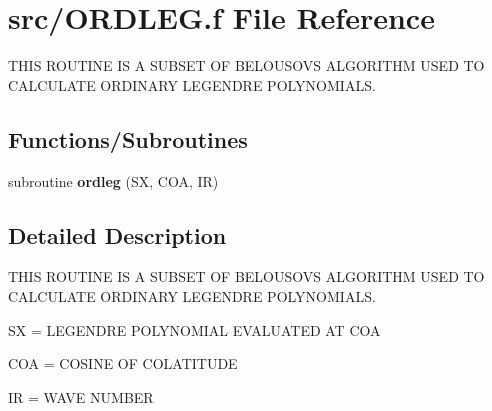 \hypertarget{ORDLEG_8f}{}\section{src/\+O\+R\+D\+L\+E\+G.f File Reference}
\label{ORDLEG_8f}


T\+H\+I\+S R\+O\+U\+T\+I\+N\+E I\+S A S\+U\+B\+S\+E\+T O\+F B\+E\+L\+O\+U\+S\+O\+V\+S A\+L\+G\+O\+R\+I\+T\+H\+M U\+S\+E\+D T\+O C\+A\+L\+C\+U\+L\+A\+T\+E O\+R\+D\+I\+N\+A\+R\+Y L\+E\+G\+E\+N\+D\+R\+E P\+O\+L\+Y\+N\+O\+M\+I\+A\+L\+S.  


\subsection*{Functions/\+Subroutines}
\begin{DoxyCompactItemize}
\item 
\hypertarget{ORDLEG_8f_a4735fe09c0b6b2fb4f5823040a0c077b}{}subroutine {\bfseries ordleg} (S\+X, C\+O\+A, I\+R)\label{ORDLEG_8f_a4735fe09c0b6b2fb4f5823040a0c077b}

\end{DoxyCompactItemize}


\subsection{Detailed Description}
T\+H\+I\+S R\+O\+U\+T\+I\+N\+E I\+S A S\+U\+B\+S\+E\+T O\+F B\+E\+L\+O\+U\+S\+O\+V\+S A\+L\+G\+O\+R\+I\+T\+H\+M U\+S\+E\+D T\+O C\+A\+L\+C\+U\+L\+A\+T\+E O\+R\+D\+I\+N\+A\+R\+Y L\+E\+G\+E\+N\+D\+R\+E P\+O\+L\+Y\+N\+O\+M\+I\+A\+L\+S. 

S\+X = L\+E\+G\+E\+N\+D\+R\+E P\+O\+L\+Y\+N\+O\+M\+I\+A\+L E\+V\+A\+L\+U\+A\+T\+E\+D A\+T C\+O\+A

C\+O\+A = C\+O\+S\+I\+N\+E O\+F C\+O\+L\+A\+T\+I\+T\+U\+D\+E

I\+R = W\+A\+V\+E N\+U\+M\+B\+E\+R 